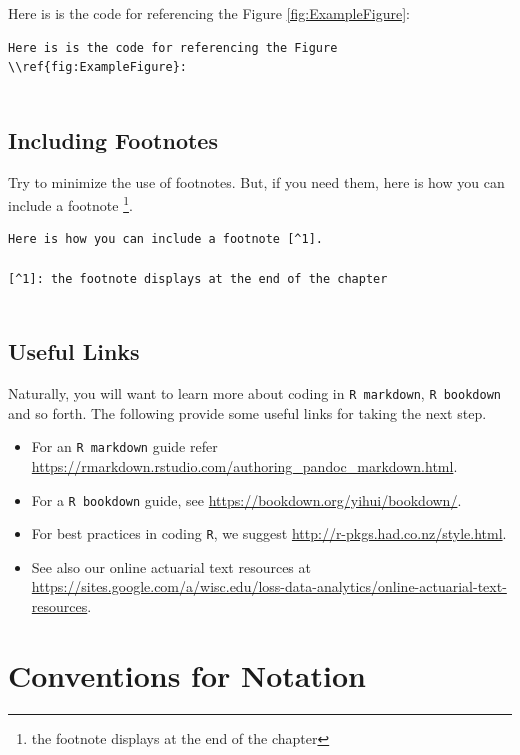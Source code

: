 \documentclass[]{book}
\let\rmarkdownfootnote\footnote%
\def\footnote{\protect\rmarkdownfootnote}
\theoremstyle{definition}
\theoremstyle{definition}
\theoremstyle{definition}
\theoremstyle{remark}
\begin{document}
Here is is the code for referencing the Figure \ref{fig:ExampleFigure}:

\begin{verbatim}
Here is is the code for referencing the Figure \\ref{fig:ExampleFigure}:
    
\end{verbatim}

\section{Including Footnotes}\label{including-footnotes}

Try to minimize the use of footnotes. But, if you need them, here is how
you can include a footnote \footnote{the footnote displays at the end of
  the chapter}.

\begin{verbatim}
Here is how you can include a footnote [^1].
    
[^1]: the footnote displays at the end of the chapter
    
\end{verbatim}

\section{Useful Links}\label{S:Links}

Naturally, you will want to learn more about coding in
\texttt{R\ markdown}, \texttt{R\ bookdown} and so forth. The following
provide some useful links for taking the next step.

\begin{itemize}
\item
  For an \texttt{R\ markdown} guide refer
  \url{https://rmarkdown.rstudio.com/authoring_pandoc_markdown.html}.
\item
  For a \texttt{R\ bookdown} guide, see
  \url{https://bookdown.org/yihui/bookdown/}.
\item
  For best practices in coding \texttt{R}, we suggest
  \url{http://r-pkgs.had.co.nz/style.html}.
\item
  See also our online actuarial text resources at
  \url{https://sites.google.com/a/wisc.edu/loss-data-analytics/online-actuarial-text-resources}.
\end{itemize}

\chapter{Conventions for Notation}\label{S:NotationConvention}
\end{document}
